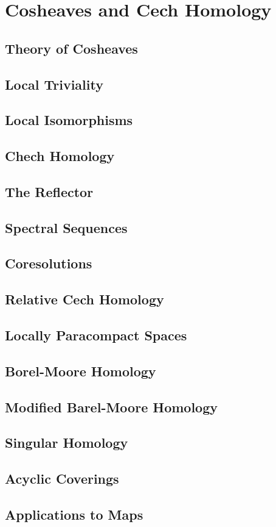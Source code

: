 \section{Cosheaves and Cech Homology}
\subsection{Theory of Cosheaves}
\subsection{Local Triviality}
\subsection{Local Isomorphisms}
\subsection{Chech Homology}
\subsection{The Reflector}
\subsection{Spectral Sequences}
\subsection{Coresolutions}
\subsection{Relative Cech Homology}
\subsection{Locally Paracompact Spaces}
\subsection{Borel-Moore Homology}
\subsection{Modified Barel-Moore Homology}
\subsection{Singular Homology}
\subsection{Acyclic Coverings}
\subsection{Applications to Maps}

